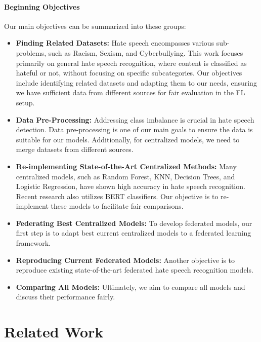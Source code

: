 \documentclass[11pt]{article}
\begin{document}
\paragraph{Beginning Objectives}
Our main objectives can be summarized into these groups:
\begin{itemize}
    \item \textbf{Finding Related Datasets:} 
    Hate speech encompasses various sub-problems, such as Racism, Sexism, and Cyberbullying. This work focuses primarily on general hate speech recognition, where content is classified as hateful or not, without focusing on specific subcategories. Our objectives include identifying related datasets and adapting them to our needs, ensuring we have sufficient data from different sources for fair evaluation in the FL setup.
    
    \item \textbf{Data Pre-Processing:} 
    Addressing class imbalance is crucial in hate speech detection. Data pre-processing is one of our main goals to ensure the data is suitable for our models. Additionally, for centralized models, we need to merge datasets from different sources.
    
    \item \textbf{Re-implementing State-of-the-Art Centralized Methods:} Many centralized models, such as Random Forest, KNN, Decision Trees, and Logistic Regression, have shown high accuracy in hate speech recognition. Recent research also utilizes BERT classifiers. Our objective is to re-implement these models to facilitate fair comparisons.
    
    \item \textbf{Federating Best Centralized Models:} To develop federated models, our first step is to adapt best current centralized models to a federated learning framework.
    
    \item \textbf{Reproducing Current Federated Models:} Another objective is to reproduce existing state-of-the-art federated hate speech recognition models.

    \item \textbf{Comparing All Models:} Ultimately, we aim to compare all models and discuss their performance fairly.
\end{itemize}









\section{Related Work}
\end{document}
